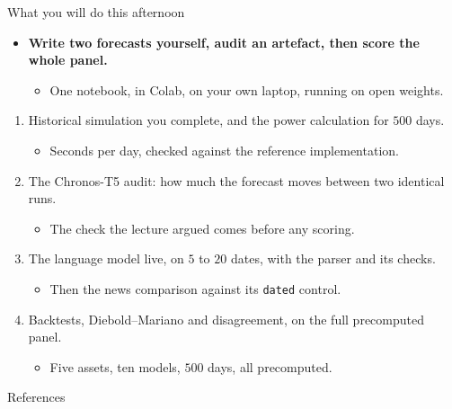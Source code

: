 \documentclass[9pt, aspectratio=169, t]{beamer}
\begin{document}
\begin{frame}{What you will do this afternoon}
  \begin{itemize}
    \item \textbf{Write two forecasts yourself, audit an artefact, then score the whole
          panel.}
      \begin{itemize}
        \item One notebook, in Colab, on your own laptop, running on open weights.
      \end{itemize}
  \end{itemize}
  \vspace{0.2em}
  \begin{enumerate}
    \item Historical simulation you complete, and the power calculation for $500$ days.
      \begin{itemize}
        \item Seconds per day, checked against the reference implementation.
      \end{itemize}
    \item The Chronos-T5 audit: how much the forecast moves between two identical runs.
      \begin{itemize}
        \item The check the lecture argued comes before any scoring.
      \end{itemize}
    \item The language model live, on $5$ to $20$ dates, with the parser and its checks.
      \begin{itemize}
        \item Then the news comparison against its \texttt{dated} control.
      \end{itemize}
    \item Backtests, Diebold--Mariano and disagreement, on the full precomputed panel.
      \begin{itemize}
        \item Five assets, ten models, $500$ days, all precomputed.
      \end{itemize}
  \end{enumerate}
  \vspace{0.4em}
\end{frame}



\begin{frame}[allowframebreaks]{References}
  \printbibliography[heading=none]
  \vspace{0.3em}

\end{frame}
\end{document}
